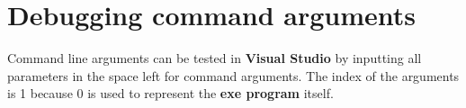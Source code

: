 
\chapter{Debugging command arguments}
Command line arguments can be tested in \textbf{Visual Studio} by inputting all parameters in the space left for command arguments. The index of the arguments is 1 because 0 is used to represent the \textbf{exe program} itself.